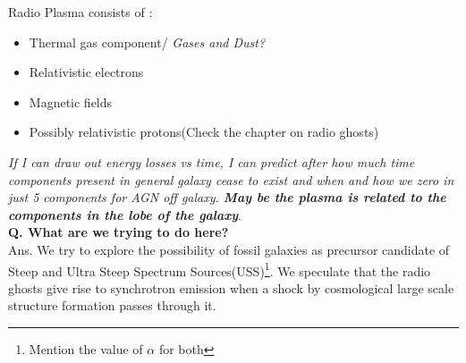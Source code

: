 \documentclass[11pt]{report}
\newcommand{\tbf}[1]{\textbf{#1}}
\newcommand{\tit}[1]{\textit{#1}}
\newcommand{\fn}[1]{\footnote{#1}}
\begin{document}
Radio Plasma consists of :
\begin{itemize}
\item Thermal gas component/ \tit{Gases and Dust?}
\item Relativistic electrons
\item Magnetic fields
\item Possibly relativistic protons(Check the chapter on radio ghosts)
\end{itemize}
\tit{If I can draw out energy losses vs time, I can predict after how much time components present in general galaxy cease to exist and when and how we zero in just 5 components for AGN off galaxy. \tbf{May be the plasma is related to the components in the lobe of the galaxy}}.\\

\tbf{Q. What are we trying to do here?}\\
Ans. We try to explore the possibility of fossil galaxies as precursor candidate of Steep and Ultra Steep Spectrum Sources(USS)\fn{Mention the value of $\alpha$ for both}. We speculate that the radio ghosts  give rise to synchrotron emission when a shock by cosmological large scale structure formation passes through it.\\
\end{document}
